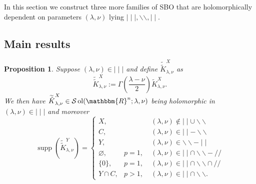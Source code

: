 \documentclass{article}
\newcommand{\assign}{:=}
\newcommand{\nin}{\not\in}
\newcommand{\tmop}[1]{\ensuremath{\operatorname{#1}}}
\newtheorem{proposition}{Proposition}[section]
\theoremstyle{remark}
\begin{document}
In this section we construct three more families of SBO that are
holomorphically dependent on parameters $(\lambda, \nu)$ lying $\mid \mid
\mid, \backslash\backslash, \mid \mid$.

\subsection{Main results}

\begin{proposition}
  \label{supp-sing:prop-supp-mmm}Suppose $(\lambda, \nu) \in \mid \mid \mid$
  and define $\widetilde{\tilde{K}}_{\lambda, \nu}^X$ as
  \[ \widetilde{\tilde{K}}_{\lambda, \nu}^X \assign \Gamma \left(
     \frac{\lambda - \nu}{2} \right) \tilde{K}_{\lambda, \nu}^X . \]
  We then have $\widetilde{\tilde{K}}_{\lambda, \nu}^X \in
  \mathcal{S} \tmop{ol} (\mathbbm{R}^n ; \lambda, \nu)$ being holomorphic in $
  (\lambda, \nu) \in \mid \mid \mid$ and moreover
  \[ \tmop{supp} (\widetilde{\tilde{K}}_{\lambda, \nu}^Y) = \left\{
     \begin{array}{lll}
       X, &  & (\lambda, \nu) \nin \mid \mid \cup \backslash\backslash\\
       C, &  & (\lambda, \nu) \in \mid \mid -\backslash\backslash\\
       Y, &  & (\lambda, \nu) \in \backslash\backslash - \mid \mid\\
       \varnothing, & p = 1, \; & (\lambda, \nu) \in \mid \mid \cap
       \backslash\backslash - / /\\
       \{ 0 \}, & p = 1, & (\lambda, \nu) \in \mid \mid \cap
       \backslash\backslash \cap / /\\
       Y \cap C, & p > 1, & (\lambda, \nu) \in \mid \mid \cap
       \backslash\backslash .
     \end{array} \right. \]
\end{proposition}
\end{document}
